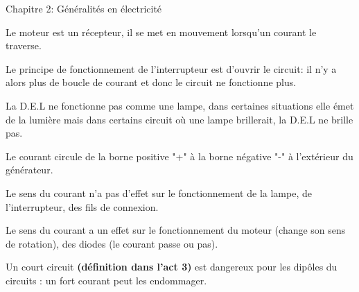 \documentclass[24pt]{article}
\newcommand{\titre}{Chapitre 2: Généralités en électricité} %
\begin{document}
\thispagestyle{fancy}
\cfoot{}

\begin{titlebox}{\titre}
    \setlength\parindent{4pt} %
    \setlength\parskip{5pt} 

    
    Le moteur est un récepteur, il se met en mouvement lorsqu'un courant le traverse.
    
    Le principe de fonctionnement de 
    l'interrupteur est d'ouvrir le circuit: il n'y a alors plus de 
    boucle de courant et donc le circuit ne fonctionne plus.
    
    La D.E.L ne fonctionne pas comme une lampe, dans certaines situations 
    elle émet de la lumière mais dans certains circuit où une lampe brillerait, la D.E.L ne brille pas. 
     
    
    \vspace{30pt}
    Le courant circule de la borne positive "+" 
    à la borne négative "-" à l'extérieur du générateur.

    Le sens du courant n'a pas d'effet sur le 
    fonctionnement de la lampe, de l'interrupteur, des fils de connexion.
    
    Le sens du courant a un effet sur le fonctionnement du moteur 
    (change son sens de rotation), des diodes (le
    courant passe ou pas).

    \begin{multicols}{2}
    [
    ]
    \hspace{-17pt}
    \begin{minipage}[t]{0.3\textwidth}
    \end{minipage}

    \begin{minipage}[t]{0.3\textwidth}
    \end{minipage}
    \end{multicols}
    
    \vspace{30pt}
    Un court circuit \textbf{\color{DarkRed} {(définition dans l'act 3)}} est dangereux
    pour les dipôles du circuits : un fort courant peut les endommager.
    

\end{titlebox}
\end{document}
